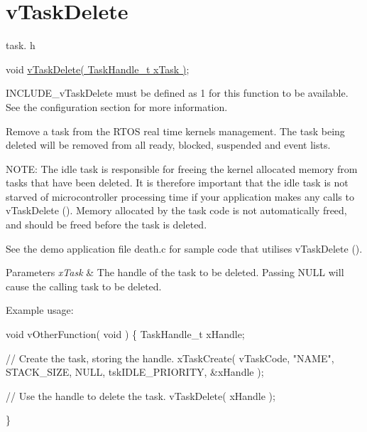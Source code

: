 \hypertarget{group__vTaskDelete}{}\section{v\+Task\+Delete}
\label{group__vTaskDelete}
task. h 
\begin{DoxyPre}void \hyperlink{task_8h_a27ff4ebce26565bef136bda84201ff80}{vTaskDelete( TaskHandle\_t xTask )};\end{DoxyPre}


I\+N\+C\+L\+U\+D\+E\+\_\+v\+Task\+Delete must be defined as 1 for this function to be available. See the configuration section for more information.

Remove a task from the R\+T\+OS real time kernel\textquotesingle{}s management. The task being deleted will be removed from all ready, blocked, suspended and event lists.

N\+O\+TE\+: The idle task is responsible for freeing the kernel allocated memory from tasks that have been deleted. It is therefore important that the idle task is not starved of microcontroller processing time if your application makes any calls to v\+Task\+Delete (). Memory allocated by the task code is not automatically freed, and should be freed before the task is deleted.

See the demo application file death.\+c for sample code that utilises v\+Task\+Delete ().


\begin{DoxyParams}{Parameters}
{\em x\+Task} & The handle of the task to be deleted. Passing N\+U\+LL will cause the calling task to be deleted.\\
\hline
\end{DoxyParams}
Example usage\+: 
\begin{DoxyPre}
void vOtherFunction( void )
\{
TaskHandle\_t xHandle;
\begin{DoxyVerb}// Create the task, storing the handle.
xTaskCreate( vTaskCode, "NAME", STACK_SIZE, NULL, tskIDLE_PRIORITY, &xHandle );

// Use the handle to delete the task.
vTaskDelete( xHandle );
\end{DoxyVerb}

\}
  \end{DoxyPre}
 